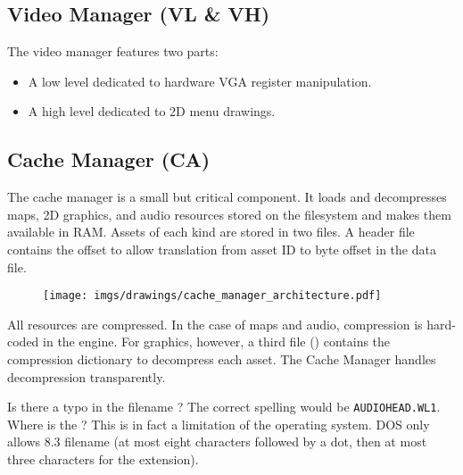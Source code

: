 \documentclass[book.tex]{subfiles}
\begin{document}
\subsection{Video Manager (VL \& VH)}
The video manager features two parts:
\begin{itemize}
\item A low level dedicated to hardware VGA register manipulation.
\item A high level dedicated to 2D menu drawings.
\end{itemize}
\par






\subsection{Cache Manager (CA)}
The cache manager is a small but critical component. It loads and decompresses maps, 2D graphics, and audio resources stored on the filesystem and makes them available in RAM. Assets of each kind are stored in two files. A header file contains the offset to allow translation from asset ID to byte offset in the data file.\\
 \par
\begin{figure}[H]
\centering
 \texttt{[image: imgs/drawings/cache\_manager\_architecture.pdf]}
 \end{figure}
 \par
{} All resources are compressed. In the case of maps and audio, compression is hard-coded in the engine. For graphics, however, a third file () contains the compression dictionary to decompress each asset. The Cache Manager handles decompression transparently.\\
\par
{} Is there a typo in the filename  ? The correct spelling would be \texttt{\justify AUDIOHEAD.WL1}. Where is the ? This is in fact a limitation of the operating system. DOS only allows 8.3 filename (at most eight characters followed by a dot, then at most three characters for the extension).
\end{document}
